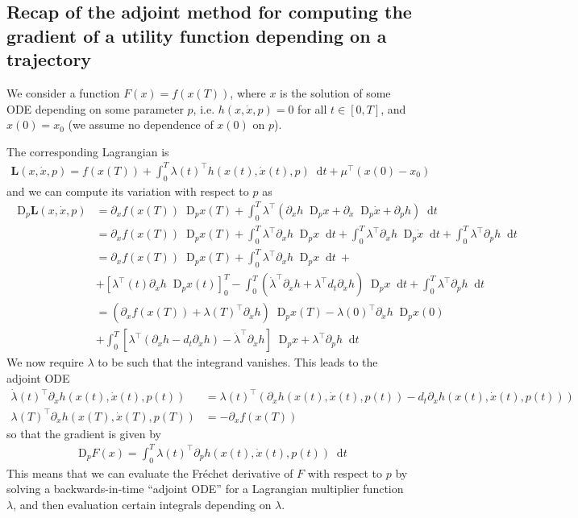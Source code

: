 \documentclass[10pt]{article}
\numberwithin{equation}{section}
\numberwithin{figure}{section}
\theoremstyle{remark}
\newcommand{\dd }{\mathop{}\!\mathrm{d}}
\newcommand{\DD }{\mathop{}\!\mathrm{D}}
\begin{document}
\begin{appendix}
\section{Recap of the adjoint method for computing the gradient of a utility function depending on a trajectory}
\label{sec:recap_adjoint}
We consider a function $F(x) = f(x(T))$, where $x$ is the solution of some ODE depending on some parameter $p$, i.e. $h(x,\dot x, p) = 0$ for all $t\in[0,T]$, and $x(0)=x_0$ (we assume no dependence of $x(0)$ on $p$).

The corresponding Lagrangian is 
\begin{align}
    \mathbf L(x,\dot x, p) = f(x(T)) + \int_0^T  \lambda(t)^\top h(x(t),\dot x(t), p)\dd t + \mu^\top (x(0)-x_0)
\end{align}
and we can compute its variation with respect to $p$ as
\begin{align}
    \DD_p\mathbf L(x,\dot x, p) &= \partial_x f(x(T)) \DD_p x(T) + \int_0^T \lambda^\top \left(\partial_x h \DD_px + \partial_{\dot x} \DD_p\dot x + \partial_p h \right)\dd t\\
    &= \partial_x f(x(T)) \DD_px(T) + \int_0^T \lambda^\top \partial_x h \DD_px \dd t+\int_0^T\lambda^\top \partial_{\dot x} h \DD_p\dot x \dd t +\int_0^T \lambda^\top\partial_p h \dd t\\
    &= \partial_x f(x(T)) \DD_p x(T) + \int_0^T \lambda^\top \partial_x h \DD_px \dd t ~+\\
    &+[\lambda^\top(t) \partial_{\dot x}h\DD_p  x(t)]_0^T - \int_0^T(\dot \lambda^\top \partial_{\dot x}h + \lambda^\top d_t \partial_{\dot x} h) \DD_px\dd t+\int_0^T \lambda^\top\partial_p h \dd t\\
    &=(\partial_x f(x(T)) + \lambda(T)^\top \partial_{\dot x}h)\DD_px(T) - \lambda(0)^\top \partial_{\dot x}h \DD_px(0)\\
    &+ \int_0^T \left[\lambda^\top \left(\partial_x h - d_t\partial_{\dot x}h \right) - \dot \lambda^\top \partial_{\dot x}h \right] \DD_px + \lambda^\top \partial_p h \dd t
\end{align}
We now require $\lambda$ to be such that the integrand vanishes. This leads to the adjoint ODE
\begin{align*}
    \dot \lambda(t)^\top \partial_{\dot x}h(x(t),\dot x(t),p(t)) &= \lambda(t)^\top(\partial_x h(x(t),\dot x(t),p(t)) - d_t \partial_{\dot x}h(x(t),\dot x(t),p(t)))\\
    \lambda(T)^\top \partial_{\dot x}h(x(T),\dot x(T),p(T)) &= -\partial_x f(x(T))
\end{align*}
so that the gradient is given by
\begin{align*}
    \DD_pF(x) = \int_0^T \lambda(t)^\top \partial_p h(x(t),\dot x(t), p(t))\dd t
\end{align*}
This means that we can evaluate the Fr\'echet derivative of $F$ with respect to $p$ by solving a backwards-in-time ``adjoint ODE'' for a Lagrangian multiplier function $\lambda$, and then evaluation certain integrals depending on $\lambda$.

\end{appendix}
\end{document}
